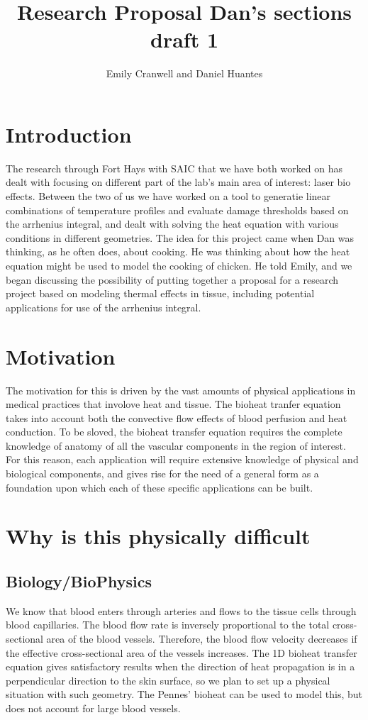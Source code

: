 \documentclass[12pt]{article}
\begin{document}
\title{Research Proposal
\large Dan's sections draft 1}
\author{Emily Cranwell and Daniel Huantes}
\maketitle
\section{Introduction}
The research through Fort Hays with SAIC that we have both worked on has dealt with focusing on different part of the lab's main area of interest: laser bio effects. Between the two of us  we have worked on a tool to generatie linear combinations of temperature profiles and evaluate damage thresholds based on the arrhenius integral, and dealt with solving the heat equation with various conditions in different geometries. The idea for this project came when Dan was thinking, as he often does, about cooking. He was thinking about how the heat equation might be used to model the cooking of chicken. He told Emily, and we began discussing the possibility of putting together a proposal for a research project based on modeling thermal effects in tissue, including potential applications for use of the arrhenius integral.

\section{Motivation}
\indent The motivation for this is driven by the vast amounts of physical applications in medical practices that involove heat and tissue. The bioheat tranfer equation takes into account both the convective flow effects of blood perfusion and heat conduction. To be sloved, the bioheat transfer equation requires the complete knowledge of anatomy of all the vascular components in the region of interest. For this reason, each application will require extensive knowledge of physical and biological components, and gives rise for the need of a general form as a foundation upon which each of these specific applications can be built. 

\section{Why is this physically difficult}

\subsection{Biology/BioPhysics}
\indent We know that blood enters through arteries and flows to the tissue cells through blood capillaries. The blood flow rate is inversely proportional to the total cross-sectional area of the blood vessels. Therefore, the blood flow velocity decreases if the effective cross-sectional area of the vessels increases. The 1D bioheat transfer equation gives satisfactory results when the direction of heat propagation is in a perpendicular direction to the skin surface, so we plan to set up a physical situation with such geometry. The Pennes' bioheat can be used to model this, but does not account for large blood vessels. 
	
\end{document}
